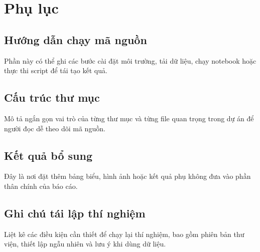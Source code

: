 \chapter{Phụ lục}

\section{Hướng dẫn chạy mã nguồn}
Phần này có thể ghi các bước cài đặt môi trường, tải dữ liệu, chạy notebook hoặc thực thi script để tái tạo kết quả.

\section{Cấu trúc thư mục}
Mô tả ngắn gọn vai trò của từng thư mục và từng file quan trọng trong dự án để người đọc dễ theo dõi mã nguồn.

\section{Kết quả bổ sung}
Đây là nơi đặt thêm bảng biểu, hình ảnh hoặc kết quả phụ không đưa vào phần thân chính của báo cáo.

\section{Ghi chú tái lập thí nghiệm}
Liệt kê các điều kiện cần thiết để chạy lại thí nghiệm, bao gồm phiên bản thư viện, thiết lập ngẫu nhiên và lưu ý khi dùng dữ liệu.